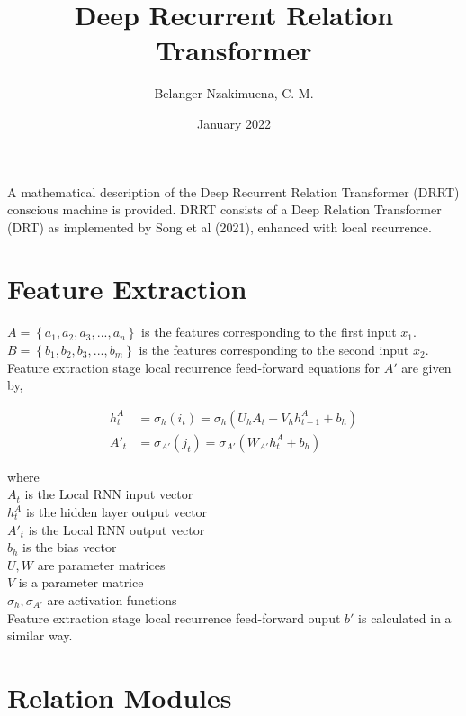 \documentclass{article}
\title{Deep Recurrent Relation Transformer}
\author{Belanger Nzakimuena, C. M.}
\date{January 2022}
\begin{document}
\maketitle

\noindent A mathematical description of the Deep Recurrent Relation Transformer (DRRT) conscious machine is provided.  DRRT consists of a Deep Relation Transformer (DRT) as implemented by Song et al (2021), enhanced with local recurrence.

\section{Feature Extraction}

\noindent $A = \left\{a_{1}, a_{2}, a_{3}, ..., a_{n}\right\}$ is the features corresponding to the first input $x_{1}$. \\
\noindent $B = \left\{b_{1}, b_{2}, b_{3}, ..., b_{m}\right\}$ is the features corresponding to the second input $x_{2}$. \\

\noindent Feature extraction stage local recurrence feed-forward equations for $A'$ are given by,

\begin{align}
h_{t}^{A} &= \sigma_{h}(i_{t}) = \sigma_{h}(U_{h}A_{t}+V_{h}h_{t-1}^{A}+b_{h}) \\
A'_{t} &= \sigma_{A'}(j_{t}) = \sigma_{A'}(W_{A'}h_{t}^{A}+b_{h})
\end{align}

where \\

\indent\indent $A_{t}$ is the Local RNN input vector \\
\indent\indent $h_{t}^{A}$ is the hidden layer output vector \\
\indent\indent $A'_{t}$ is the Local RNN output vector \\
\indent\indent $b_{h}$ is the bias vector \\
\indent\indent $U, W$ are parameter matrices \\
\indent\indent $V$ is a parameter matrice \\
\indent\indent $\sigma_{h}, \sigma_{A'}$ are activation functions \\

\noindent Feature extraction stage local recurrence feed-forward ouput $b'$ is calculated in a similar way.

\section{Relation Modules}
\end{document}
